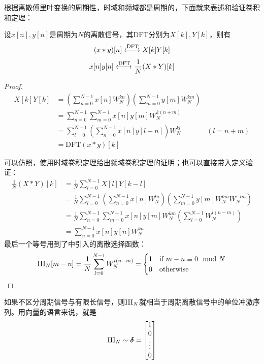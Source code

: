 根据离散傅里叶变换的周期性，时域和频域都是周期的，下面就来表述和验证卷积和定理：
\begin{theorem}[离散傅里叶变换的卷积和定理]\label{thm:DFT_conv}
    设$x[n],y[n]$是周期为$N$的离散信号，其DFT分别为$X[k],Y[k]$，则有
    \[(x*y)[n]\xleftrightarrow{\mathrm{DFT}}X[k]Y[k]\]
    \[x[n]y[n]\xleftrightarrow{\mathrm{DFT}}\frac{1}{N}(X * Y)[k]\]
\end{theorem}
\begin{proof}
    \begin{align*}
        X[k]Y[k]&=\left(\sum_{n=0}^{N-1}x[n]W_N^{kn}\right)\left(\sum_{m=0}^{N-1}y[m]W_N^{km}\right)\\
        &=\sum_{n=0}^{N-1}\sum_{m=0}^{N-1}x[n]y[m]W_N^{k(n+m)}\\
        &=\sum_{l=0}^{N-1}\left(\sum_{n=0}^{N-1}x[n]y[l-n]\right)W_N^{kl}&(l=n+m)\\
        &=\mathrm{DFT}(x*y)[k]
    \end{align*}

    可以仿照，使用时域卷积定理给出频域卷积定理的证明；也可以直接带入定义验证：
    \begin{align*}
        \frac{1}{N}(X * Y)[k]&=\frac{1}{N}\sum_{l=0}^{N-1}X[l]Y[k-l]\\
        &=\frac{1}{N}\sum_{l=0}^{N-1}\left(\sum_{n=0}^{N-1}x[n]W_N^{ln}\right)\left(\sum_{m=0}^{N-1}y[m]W_N^{k m}W_N^{-lm}\right)\\
        &=\frac{1}{N}\sum_{n=0}^{N-1}\sum_{m=0}^{N-1}x[n]y[m]W_N^{k m}\left(\sum_{l=0}^{N-1}W_N^{l(n-m)}\right)\\
        &=\sum_{n=0}^{N-1}x[n]y[n]W_N^{k n}
    \end{align*}
    最后一个等号用到了中引入的离散选择函数：
    \[\operatorname{III}_N[m-n]=\frac{1}{N}\sum_{l=0}^{N-1}W_N^{l(n-m)}=\begin{cases}
    1 & \text{if } m-n\equiv 0 \mod N \\
    0 & \mathrm{otherwise}
    \end{cases}\]
\end{proof}

如果不区分周期信号与有限长信号，则$\operatorname{III}_N$就相当于周期离散信号中的单位冲激序列。用向量的语言来说，就是
\[\operatorname{III}_N\sim\boldsymbol{\delta}=\begin{bmatrix}
1  \\
0  \\
\vdots \\
0
\end{bmatrix}\]

